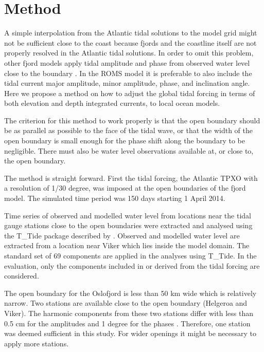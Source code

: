 \section{Method}

A simple interpolation from the Atlantic tidal solutions to the model grid might not be sufficient close to the coast because fjords and the coastline itself are not properly resolved in the Atlantic tidal solutions. In order to omit this problem, other fjord models apply tidal amplitude and phase from observed water level close to the boundary \cite[i.e.]{foreman90,svendsen96,lynge13}. In the ROMS model it is preferable to also include the tidal current major amplitude, minor amplitude, phase, and inclination angle. Here we propose a method on how to adjust the global tidal forcing in terms of both elevation and depth integrated currents, to local ocean models. 

The criterion for this method to work properly is that the open boundary should be as parallel as possible to the face of the tidal wave, or that the width of the open boundary is small enough for the phase shift along the boundary to be negligible. There must also be water level observations available at, or close to, the open boundary.

The method is straight forward. First the tidal forcing, the Atlantic TPXO with a resolution of 1/30 degree, was imposed at the open boundaries of the fjord model. The simulated time period was 150 days starting 1 April 2014. 

Time series of observed and modelled water level from locations near the tidal gauge stations close to the open boundaries were extracted and analysed using the T\_Tide package described by \cite{pawlowicz02}. Observed and modelled water level are extracted from a location near Viker which lies inside the model domain. 
The standard set of 69 components are applied in the analyses using T\_Tide. In the evaluation, only the components included in or derived from the tidal forcing are considered. 

The open boundary for the Oslofjord is less than 50 km wide which is relatively narrow. Two stations are available close to the open boundary (Helgeroa and Viker). The harmonic components from these two stations differ with less than 0.5 cm for the amplitudes and 1 degree for the phases \cite[]{tide16}. Therefore, one station was deemed sufficient in this study. For wider openings it might be necessary to apply more stations. 

